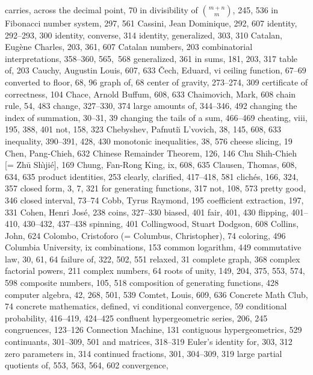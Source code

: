 carries,
\sub across the decimal point, 70
\sub in divisibility of $m+n\choose m$, 245, 536
\sub in Fibonacci number system, 297, 561
Cassini, Jean Dominique, 292, 607
\sub identity, 292--293, 300
\sub identity, converse, 314
\sub identity, generalized, 303, 310
Catalan, Eug\`ene Charles, 203, 361, 607
Catalan numbers, 203
\sub combinatorial interpretations, 358--360, 565,~568
\sub generalized, 361
\sub in sums, 181, 203, 317
\sub table of, 203
Cauchy, Augustin Louis, 607, 633
\v{C}ech, Eduard, vi
ceiling function, 67--69
\sub converted to floor, 68, 96
\sub graph of, 68
center of gravity, 273--274, 309
certificate of correctness, 104
Chace, Arnold Buffum, 608, 633
Chaimovich, Mark, 608
chain rule, 54, 483
change, 327--330, 374
\sub large amounts of, 344--346, 492
changing the index of summation, 30--31, 39
changing the tails of a sum, 466--469
cheating, viii, 195, 388, 401
\sub not, 158, 323
Chebyshev, Pafnuti{\u\i} L'vovich, 38, 145, 608, 633
\sub inequality, 390--391, 428, 430
\sub monotonic inequalities, 38, 576
cheese slicing, 19
Chen, Pang-Chieh, 632
Chinese Remainder Theorem, 126, 146
Chu Shih-Chieh [= Zh\=u Sh\`{\i}ji\'e], 169
Chung, Fan-Rong King, ix, 608, 635
Clausen, Thomas, 608, 634, 635
\sub product identities, 253
clearly, clarified, 417--418, 581
clich\'es, 166, 324, 357
closed form, 3, 7, 321
\sub for generating functions, 317
\sub not, 108, 573
\sub pretty good, 346
closed interval, 73--74
Cobb, Tyrus Raymond, 195
coefficient extraction, 197, 331
Cohen, Henri Jos\'e, 238
coins, 327--330
\sub biased, 401
\sub fair, 401, 430
\sub flipping, 401--410, 430--432, 437--438
\sub spinning, 401
Collingwood, Stuart Dodgson, 608
Collins, John, 624
Colombo, Cristoforo (= Columbus, Christopher), 74
coloring, 496
Columbia University, ix
combinations, 153
common logarithm, 449
commutative law, 30, 61, 64
\sub failure of, 322, 502, 551
\sub relaxed, 31
complete graph, 368
complex factorial powers, 211
complex numbers, 64
\sub roots of unity, 149, 204, 375, 553, 574, 598
composite numbers, 105, 518
composition of generating functions, 428
computer algebra, 42, 268, 501, 539
Comtet, Louis, 609, 636
Concrete Math Club, 74
concrete mathematics, defined, vi
conditional convergence, 59
conditional probability, 416--419, 424--425
confluent hypergeometric series, 206, 245
congruences, 123--126
Connection Machine, 131
contiguous hypergeometrics, 529
continuants, 301--309, 501
\sub and matrices, 318--319
\sub Euler's identity for, 303, 312
\sub zero parameters in, 314
continued fractions, 301, 304--309, 319
\sub large partial quotients of, 553, 563, 564, 602
convergence,
